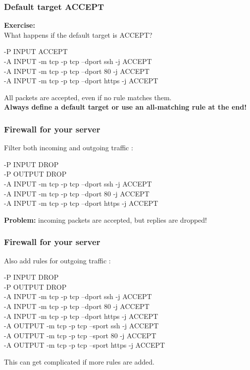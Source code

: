 \documentclass[14pt]{beamer}
\begin{document}
  \begin{frame}
    \frametitle{Default target ACCEPT}
    \textbf{Exercise:}\\
    What happens if the default target is ACCEPT?
    \begin{example}
      \small{-P INPUT ACCEPT\\
      -A INPUT -m tcp -p tcp --dport ssh -j ACCEPT\\
      -A INPUT -m tcp -p tcp --dport 80 -j ACCEPT\\
      -A INPUT -m tcp -p tcp --dport https -j ACCEPT}
    \end{example}
    \pause
    All packets are accepted, even if no rule matches them.\\
    \pause
    \textbf{Always define a default target or use an all-matching rule at the end!}
  \end{frame}
  \begin{frame}
    \frametitle{Firewall for your server}
    Filter both incoming and outgoing traffic :
    \begin{example}
      \small{-P INPUT DROP\\
      -P OUTPUT DROP\\
      -A INPUT -m tcp -p tcp --dport ssh -j ACCEPT\\
      -A INPUT -m tcp -p tcp --dport 80 -j ACCEPT\\
      -A INPUT -m tcp -p tcp --dport https -j ACCEPT}
    \end{example}
    \pause
    \textbf{Problem:} incoming packets are accepted, but replies are dropped!
  \end{frame}
  \begin{frame}
    \frametitle{Firewall for your server}
    Also add rules for outgoing traffic :
    \begin{example}
      \small{-P INPUT DROP\\
      -P OUTPUT DROP\\
      -A INPUT -m tcp -p tcp --dport ssh -j ACCEPT\\
      -A INPUT -m tcp -p tcp --dport 80 -j ACCEPT\\
      -A INPUT -m tcp -p tcp --dport https -j ACCEPT\\
      -A OUTPUT -m tcp -p tcp --sport ssh -j ACCEPT\\
      -A OUTPUT -m tcp -p tcp --sport 80 -j ACCEPT\\
      -A OUTPUT -m tcp -p tcp --sport https -j ACCEPT}
    \end{example}
    \pause
    This can get complicated if more rules are added.
  \end{frame}
\end{document}
